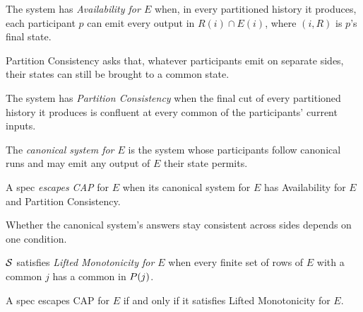 \begin{definition}[Availability]
\label{def:partition-notions}
The system has \emph{Availability for $E$} when, in every partitioned history
it produces, each participant $p$ can emit every output in $R(i)\cap E(i)$,
where $(i,R)$ is $p$'s final state.
\end{definition}

Partition Consistency asks that, whatever participants emit on separate sides,
their states can still be brought to a common state.

\begin{definition}
\label{def:partition-consistency}
The system has \emph{Partition Consistency} when the final cut of every
partitioned history it produces is confluent at every common \indesc of the
participants' current inputs.
\end{definition}

The \emph{canonical system for $E$} is the system whose participants follow
canonical runs and may emit any output of $E$ their state permits.

\begin{definition}
\label{def:escapes-cap}
A spec \emph{escapes CAP} for $E$ when its canonical system for $E$ has
Availability for $E$ and Partition Consistency.
\end{definition}

Whether the canonical system's answers stay consistent across sides depends on
one condition.

\begin{definition}
\label{def:lm-for-A}
$\mathcal{S}$ satisfies \emph{Lifted Monotonicity for $E$} when every finite set of
rows of $E$ with a common \indesc $j$ has a common \outnoun in $P(j)$.
\end{definition}

\begin{theorem}
\label{thm:complete-cap}
A spec escapes CAP for $E$ if and only if it satisfies Lifted Monotonicity for
$E$.
\end{theorem}

